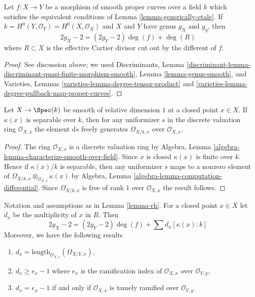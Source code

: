 \begin{lemma}
\label{lemma-rh}
Let $f : X \to Y$ be a morphism of smooth proper curves
over a field $k$ which satisfies the equivalent conditions of
Lemma \ref{lemma-generically-etale}. If
$k = H^0(Y, \mathcal{O}_Y) = H^0(X, \mathcal{O}_X)$
and $X$ and $Y$ have genus $g_X$ and $g_y$, then
$$
2g_X - 2 = (2g_Y - 2) \deg(f) + \deg(R)
$$
where $R \subset X$ is the effective Cartier divisor cut out by
the different of $f$.
\end{lemma}

\begin{proof}
See discussion above; we used
Discriminants, Lemma
\ref{discriminant-lemma-discriminant-quasi-finite-morphism-smooth},
Lemma \ref{lemma-genus-smooth}, and
Varieties, Lemmas \ref{varieties-lemma-degree-tensor-product} and
\ref{varieties-lemma-degree-pullback-map-proper-curves}.
\end{proof}

\begin{lemma}
\label{lemma-uniformizer-works}
Let $X \to \Spec(k)$ be smooth of relative dimension $1$ at a closed
point $x \in X$. If $\kappa(x)$ is separable over $k$, then for
any uniformizer $s$ in the discrete valuation ring $\mathcal{O}_{X, x}$
the element $\text{d}s$ freely generates $\Omega_{X/k, x}$
over $\mathcal{O}_{X, x}$.
\end{lemma}

\begin{proof}
The ring $\mathcal{O}_{X, x}$ is a discrete valuation ring by
Algebra, Lemma \ref{algebra-lemma-characterize-smooth-over-field}.
Since $x$ is closed $\kappa(x)$ is finite over $k$. Hence if
$\kappa(x)/k$ is separable, then any uniformizer $s$
maps to a nonzero element of
$\Omega_{X/k, x} \otimes_{\mathcal{O}_{X, x}} \kappa(x)$ by
Algebra, Lemma \ref{algebra-lemma-computation-differential}.
Since $\Omega_{X/k, x}$ is free of rank $1$ over $\mathcal{O}_{X, x}$
the result follows.
\end{proof}

\begin{lemma}
\label{lemma-rhe}
Notation and assumptions as in Lemma \ref{lemma-rh}. For a closed point
$x \in X$ let $d_x$ be the multiplicity of $x$ in $R$. Then
$$
2g_X - 2 = (2g_Y - 2) \deg(f) + \sum\nolimits d_x [\kappa(x) : k]
$$
Moreover, we have the following results
\begin{enumerate}
\item $d_x = \text{length}_{\mathcal{O}_{X, x}}(\Omega_{X/Y, x})$,
\item $d_x \geq e_x - 1$ where $e_x$ is the ramification index
of $\mathcal{O}_{X, x}$ over $\mathcal{O}_{Y, y}$,
\item $d_x = e_x - 1$ if and only if $\mathcal{O}_{X, x}$ is tamely
ramified over $\mathcal{O}_{Y, y}$.
\end{enumerate}
\end{lemma}

